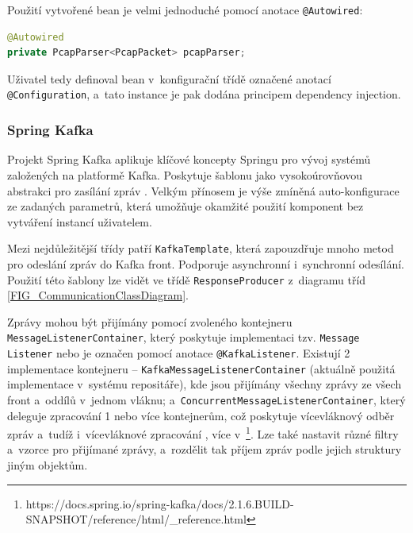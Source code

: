 \noindent Použití vytvořené bean je velmi jednoduché pomocí anotace \texttt{@Autowired}:

\begin{lstlisting}[language=Java,frame=tb,basicstyle={\small\ttfamily}]
@Autowired
private PcapParser<PcapPacket> pcapParser;
\end{lstlisting}

\noindent Uživatel tedy definoval bean v~konfigurační třídě označené anotací \texttt{@Configuration}, a~tato instance je pak dodána principem dependency injection.

\subsubsection{Spring Kafka} \label{springKafka}
Projekt Spring Kafka aplikuje klíčové koncepty Springu pro vývoj systémů založených na platformě Kafka. Poskytuje šablonu jako vysokoúrovňovou abstrakci pro zasílání zpráv \cite{springKafka}. Velkým přínosem je výše zmíněná auto-konfigurace ze zadaných parametrů, která umožňuje okamžité použití komponent bez vytváření instancí uživatelem.

Mezi nejdůležitější třídy patří \texttt{KafkaTemplate}, která zapouzdřuje mnoho metod pro odeslání zpráv do Kafka front. Podporuje asynchronní i~synchronní odesílání. Použití této šablony lze vidět ve třídě \texttt{ResponseProducer} z~diagramu tříd \ref{FIG_CommunicationClassDiagram}.

Zprávy mohou být přijímány pomocí zvoleného kontejneru \texttt{MessageListenerContainer}, který poskytuje implementaci tzv. \texttt{Message Listener} nebo je označen pomocí anotace \texttt{@KafkaListener}. Existují 2 implementace kontejneru -- \texttt{KafkaMessageListenerContainer} (aktuálně použitá implementace v~systému repositáře), kde jsou přijímány všechny zprávy ze všech front a~oddílů v~jednom vláknu; a~\texttt{ConcurrentMessageListenerContainer}, který deleguje zpracování 1 nebo více kontejnerům, což poskytuje vícevláknový odběr zpráv a~tudíž i~vícevláknové zpracování \cite{springKafka}, více v~\footnote{https://docs.spring.io/spring-kafka/docs/2.1.6.BUILD-SNAPSHOT/reference/html/\_reference.html}. Lze také nastavit různé filtry a~vzorce pro přijímané zprávy, a~rozdělit tak příjem zpráv podle jejich struktury jiným objektům.

